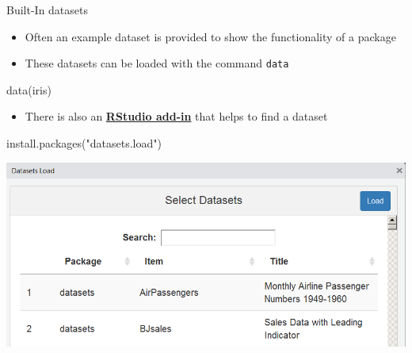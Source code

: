 \documentclass[
  10pt,
  ignorenonframetext,
]{beamer}
\newenvironment{Shaded}{\begin{snugshade}}{\end{snugshade}}
\newcommand{\KeywordTok}[1]{\textcolor[rgb]{0.94,0.87,0.69}{#1}}
\newcommand{\NormalTok}[1]{\textcolor[rgb]{0.80,0.80,0.80}{#1}}
\newcommand{\StringTok}[1]{\textcolor[rgb]{0.80,0.58,0.58}{#1}}
\providecommand{\tightlist}{%
  \setlength{\itemsep}{0pt}\setlength{\parskip}{0pt}}
\begin{document}
\begin{frame}[fragile]{Built-In datasets}
\protect\hypertarget{built-in-datasets}{}

\begin{itemize}
\tightlist
\item
  Often an example dataset is provided to show the functionality of a
  package
\item
  These datasets can be loaded with the command \texttt{data}
\end{itemize}

\begin{Shaded}
\begin{Highlighting}[]
\KeywordTok{data}\NormalTok{(iris)}
\end{Highlighting}
\end{Shaded}

\begin{itemize}
\tightlist
\item
  There is also an
  \href{https://github.com/bquast/datasets.load}{\textbf{RStudio
  add-in}} that helps to find a dataset
\end{itemize}

\begin{Shaded}
\begin{Highlighting}[]
\KeywordTok{install.packages}\NormalTok{(}\StringTok{"datasets.load"}\NormalTok{)}
\end{Highlighting}
\end{Shaded}

\includegraphics{figure/datasetsload.PNG}

\end{frame}
\end{document}

